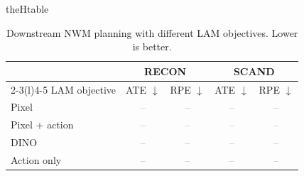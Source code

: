 \documentclass{article}
\newcommand{\TBD}{\textcolor{gray}{--}}
\newcommand{\tablepart}[1]{%
  \renewcommand{\thetable}{\arabic{table}#1}%
  \ifcsname theHtable\endcsname
    \renewcommand{\theHtable}{\arabic{table}.#1}%
  \fi
}
\newcommand{\continuedtablepart}[1]{%
  \addtocounter{table}{-1}%
  \tablepart{#1}%
}
\begin{document}
\begin{table}[t]
  \continuedtablepart{b}
  \caption{Downstream NWM planning with different LAM objectives. Lower is
  better.}
  \label{tab:lam_downstream_planning}
  \centering
  \small
  \setlength{\tabcolsep}{8pt}
  \renewcommand{\arraystretch}{1.06}
  \begin{tabular}{l cc cc}
    \toprule
    & \multicolumn{2}{c}{RECON} & \multicolumn{2}{c}{SCAND} \\
    \cmidrule(lr){2-3}\cmidrule(l){4-5}
    LAM objective & ATE $\downarrow$ & RPE $\downarrow$
    & ATE $\downarrow$ & RPE $\downarrow$ \\
    \midrule
    Pixel & \TBD & \TBD & \TBD & \TBD \\
    Pixel + action & \TBD & \TBD & \TBD & \TBD \\
    DINO & \TBD & \TBD & \TBD & \TBD \\
    Action only & \TBD & \TBD & \TBD & \TBD \\
    \bottomrule
  \end{tabular}
\end{table}
\end{document}
